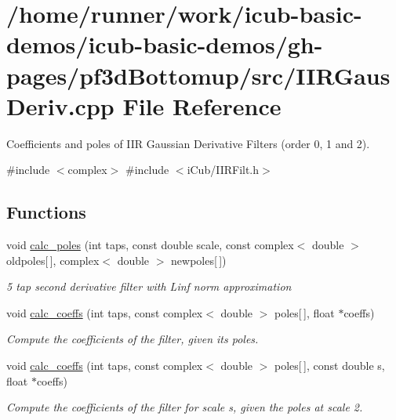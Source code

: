 \section{/home/runner/work/icub-\/basic-\/demos/icub-\/basic-\/demos/gh-\/pages/pf3d\+Bottomup/src/\+I\+I\+R\+Gaus\+Deriv.cpp File Reference}
\label{IIRGausDeriv_8cpp}


Coefficients and poles of I\+IR Gaussian Derivative Filters (order 0, 1 and 2).  


{\ttfamily \#include $<$complex$>$}\newline
{\ttfamily \#include $<$i\+Cub/\+I\+I\+R\+Filt.\+h$>$}\newline
\subsection*{Functions}
\begin{DoxyCompactItemize}
\item 
void \hyperlink{IIRGausDeriv_8cpp_a2741eb625282f8d68ba971a4431407a5}{calc\+\_\+poles} (int taps, const double scale, const complex$<$ double $>$ oldpoles\mbox{[}$\,$\mbox{]}, complex$<$ double $>$ newpoles\mbox{[}$\,$\mbox{]})
\begin{DoxyCompactList}\small\item\em 5 tap second derivative filter with Linf norm approximation \end{DoxyCompactList}\item 
void \hyperlink{IIRGausDeriv_8cpp_a3e7f009d38086e228c6ba8b3e5b6055f}{calc\+\_\+coeffs} (int taps, const complex$<$ double $>$ poles\mbox{[}$\,$\mbox{]}, float $\ast$coeffs)
\begin{DoxyCompactList}\small\item\em Compute the coefficients of the filter, given its poles. \end{DoxyCompactList}\item 
void \hyperlink{IIRGausDeriv_8cpp_a3e168333285d90a0bfd848d9791ca427}{calc\+\_\+coeffs} (int taps, const complex$<$ double $>$ poles\mbox{[}$\,$\mbox{]}, const double s, float $\ast$coeffs)
\begin{DoxyCompactList}\small\item\em Compute the coefficients of the filter for scale s, given the poles at scale 2. \end{DoxyCompactList}\end{DoxyCompactItemize}
